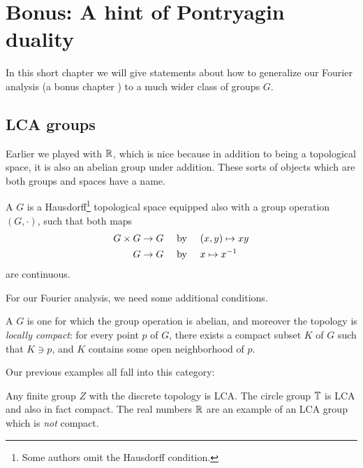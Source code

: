 \chapter{Bonus: A hint of Pontryagin duality}
\label{ch:pontryagin}

In this short chapter we will give statements
about how to generalize our Fourier analysis
(a bonus chapter )
to a much wider class of groups $G$.

\section{LCA groups}
Earlier we played with $\mathbb R$,
which is nice because in addition to being a topological space,
it is also an abelian group under addition.
These sorts of objects which are both groups and spaces have a name.
\begin{definition}
	A  $G$
	is a Hausdorff\footnote{Some authors omit the Hausdorff condition.}
	topological space equipped also with a group operation $(G, \cdot)$,
	such that both maps
	\begin{align*}
		G \times G &\to G \quad\text{ by }\quad (x,y) \mapsto xy \\
		G &\to G \quad\text{ by }\quad x \mapsto x^{-1}
	\end{align*}
	are continuous.
\end{definition}

For our Fourier analysis, we need some additional conditions.
\begin{definition}
	A  $G$
	is one for which the group operation is abelian,
	and moreover the topology is \emph{locally compact}:
	for every point $p$ of $G$,
	there exists a compact subset $K$ of $G$
	such that $K \ni p$, and $K$ contains some open neighborhood of $p$.
\end{definition}

Our previous examples all fall into this category:
\begin{example}
	\listhack
	\begin{itemize}
		\ii Any finite group $Z$ with the discrete topology is LCA.
		\ii The circle group $\mathbb T$ is LCA and also in fact compact.
		\ii The real numbers $\mathbb R$ are an example of an LCA group
		which is \emph{not} compact.
	\end{itemize}
\end{example}

